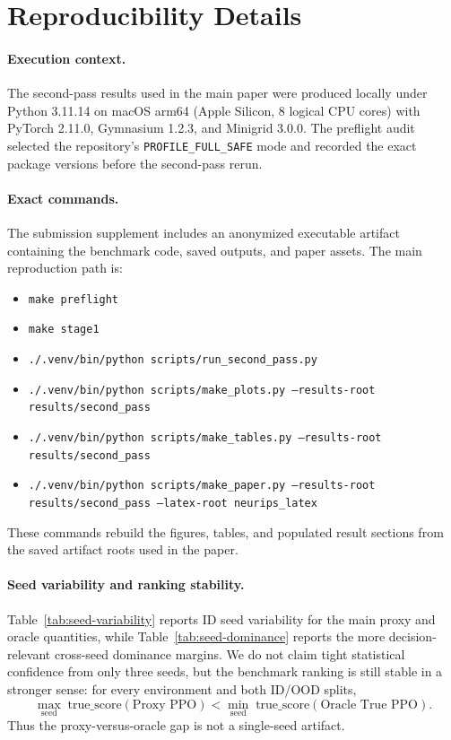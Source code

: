 \section{Reproducibility Details}
\paragraph{Execution context.}
The second-pass results used in the main paper were produced locally under
Python 3.11.14 on macOS arm64 (Apple Silicon, 8 logical CPU cores) with
PyTorch 2.11.0, Gymnasium 1.2.3, and Minigrid 3.0.0. The preflight audit
selected the repository's \texttt{PROFILE\_FULL\_SAFE} mode and recorded the
exact package versions before the second-pass rerun.

\paragraph{Exact commands.}
The submission supplement includes an anonymized executable artifact containing
the benchmark code, saved outputs, and paper assets. The main reproduction path
is:
\begin{itemize}
\item \texttt{make preflight}
\item \texttt{make stage1}
\item \texttt{./.venv/bin/python scripts/run\_second\_pass.py}
\item \texttt{./.venv/bin/python scripts/make\_plots.py --results-root results/second\_pass}
\item \texttt{./.venv/bin/python scripts/make\_tables.py --results-root results/second\_pass}
\item \texttt{./.venv/bin/python scripts/make\_paper.py --results-root results/second\_pass --latex-root neurips\_latex}
\end{itemize}
These commands rebuild the figures, tables, and populated result sections from
the saved artifact roots used in the paper.

\paragraph{Seed variability and ranking stability.}
Table~\ref{tab:seed-variability} reports ID seed variability for the main proxy
and oracle quantities, while Table~\ref{tab:seed-dominance} reports the more
decision-relevant cross-seed dominance margins. We do not claim tight
statistical confidence from only three seeds, but the benchmark ranking is
still stable in a stronger sense:
for every environment and both ID/OOD splits,
\[
\max_{\text{seed}} \; \text{true\_score}(\text{Proxy PPO})
<
\min_{\text{seed}} \; \text{true\_score}(\text{Oracle True PPO}).
\]
Thus the proxy-versus-oracle gap is not a single-seed artifact.

